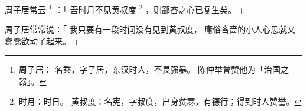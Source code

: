 
\switchcolumn*[\section{}]

周子居常云%
\footnote{%
    周子居：
    名乘，字子居，东汉时人，不畏强暴。
    陈仲举曾赞他为「治国之器」。
}%
：「
    吾时月不见黄叔度%
    \footnote{%
        时月：时日。
        黄叔度：名宪，字叔度，出身贫寒，有德行；得到时人赞誉。
    }%
    ，则鄙吝之心已复生矣。
」

\switchcolumn

周子居常常说：「
    我只要有一段时间没有见到黄叔度，
    庸俗吝啬的小人心思就又蠢蠢欲动了起来。
」

